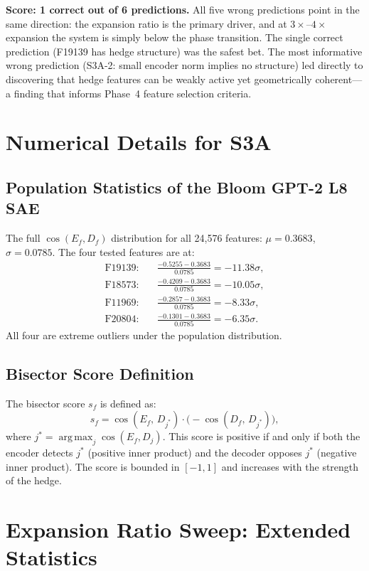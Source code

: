 \documentclass[11pt,a4paper]{article}
\newcommand{\Ef}{E_f}
\newcommand{\Df}{D_f}
\DeclareMathOperator*{\argmax}{arg\,max}
\begin{document}
\noindent
\textbf{Score: 1 correct out of 6 predictions.}  All five wrong predictions point in
the same direction: the expansion ratio is the primary driver, and at
$3\times$--$4\times$ expansion the system is simply below the phase transition.
The single correct prediction (F19139 has hedge structure) was the safest bet.
The most informative wrong prediction (S3A-2: small encoder norm implies no structure)
led directly to discovering that hedge features can be weakly active yet geometrically
coherent---a finding that informs Phase~4 feature selection criteria.

\section{Numerical Details for S3A}

\subsection{Population Statistics of the Bloom GPT-2 L8 SAE}

The full $\cos(\Ef, \Df)$ distribution for all 24{,}576 features:
$\mu{=}0.3683$, $\sigma{=}0.0785$.
The four tested features are at:
\begin{align*}
\text{F19139:} &\quad \frac{-0.5255 - 0.3683}{0.0785} = -11.38\sigma,\\
\text{F18573:} &\quad \frac{-0.4209 - 0.3683}{0.0785} = -10.05\sigma,\\
\text{F11969:} &\quad \frac{-0.2857 - 0.3683}{0.0785} = -8.33\sigma,\\
\text{F20804:} &\quad \frac{-0.1301 - 0.3683}{0.0785} = -6.35\sigma.
\end{align*}
All four are extreme outliers under the population distribution.

\subsection{Bisector Score Definition}

The bisector score $s_f$ is defined as:
\[
  s_f = \cos(\Ef,\, D_{j^*}) \cdot \bigl(-\cos(\Df,\, D_{j^*})\bigr),
\]
where $j^* = \argmax_j \cos(\Ef, D_j)$.  This score is positive if and only if
both the encoder detects $j^*$ (positive inner product) and the decoder opposes $j^*$
(negative inner product).  The score is bounded in $[-1, 1]$ and increases with the
strength of the hedge.

\section{Expansion Ratio Sweep: Extended Statistics}
\end{document}
